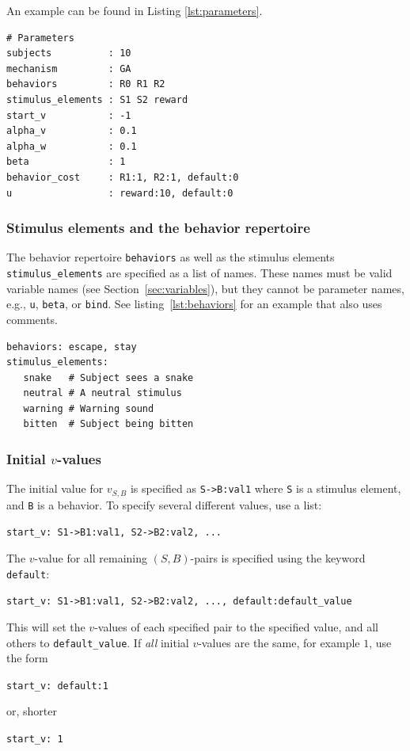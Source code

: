 \documentclass[11pt]{article}
\newcommand{\scr}[1]{\lstinline|#1|}
\begin{document}
An example can be found in Listing \ref{lst:parameters}.
\begin{lstlisting}[caption={An example of setting parameters}, label=lst:parameters]
# Parameters
subjects          : 10
mechanism         : GA
behaviors         : R0 R1 R2
stimulus_elements : S1 S2 reward
start_v           : -1
alpha_v           : 0.1
alpha_w           : 0.1
beta              : 1
behavior_cost     : R1:1, R2:1, default:0
u                 : reward:10, default:0
\end{lstlisting}

\subsubsection{Stimulus elements and the behavior repertoire\label{sec:behaviors}}
The behavior repertoire \scr{behaviors} as well as the stimulus elements \scr{stimulus_elements} are specified as a list of names. These names must be valid variable names (see Section~\ref{sec:variables}), but they cannot be parameter names, e.g., \scr{u}, \scr{beta}, or \scr{bind}. See listing~\ref{lst:behaviors} for an example that also uses comments.
\begin{lstlisting}[caption=\scr{behaviors} and \scr{stimulus_elements}, label=lst:behaviors]
behaviors: escape, stay
stimulus_elements: 
   snake   # Subject sees a snake
   neutral # A neutral stimulus
   warning # Warning sound
   bitten  # Subject being bitten
\end{lstlisting}


\subsubsection{Initial $v$-values \label{sec:start_v}}
The initial value for $v_{S,B}$ is specified as
\scr{S->B:val1}
where \scr{S} is a stimulus element, and \scr{B} is a behavior.
To specify several different values, use a list:
\begin{center}
	\scr{start_v: S1->B1:val1, S2->B2:val2, ...}
\end{center}
The $v$-value for all remaining $(S,B)$-pairs is specified using the keyword \scr{default}:
\begin{center}
	\scr{start_v: S1->B1:val1, S2->B2:val2, ..., default:default_value}
\end{center}
This will set the $v$-values of each specified pair to the specified value, and all others to \scr{default_value}.
If \emph{all} initial $v$-values are the same, for example $1$, use the form
\begin{center}
	\scr{start_v: default:1}
\end{center}
or, shorter
\begin{center}
	\scr{start_v: 1}
\end{center}
\end{document}
